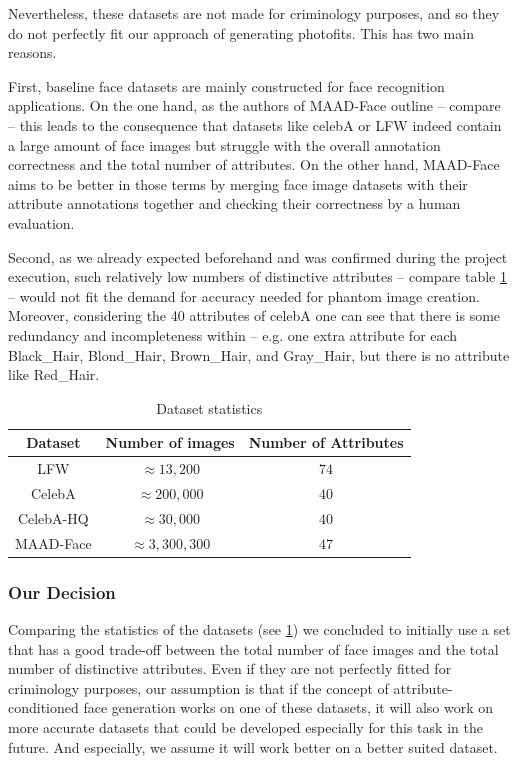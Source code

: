 \documentclass[12pt, a4paper]{article}
\begin{document}
Nevertheless, these datasets are not made for criminology purposes, and so they do not perfectly fit our approach of
generating photofits. This has two main reasons.

First, baseline face datasets are mainly constructed for face recognition applications. On the one hand, as the authors
of MAAD-Face outline -- compare \cite{DBLP2} -- this leads to the consequence that datasets like
celebA or LFW indeed contain a large amount of face images but struggle with the overall annotation correctness and the total number of attributes.
On the other hand, MAAD-Face aims to be better in those terms by merging
face image datasets with their attribute annotations together and checking their correctness by a human evaluation.

Second, as we already expected beforehand and was confirmed during the project execution, such relatively low numbers of
distinctive attributes -- compare table \ref{tab:dataset-stats} -- would not fit the demand for accuracy needed for phantom image creation.
Moreover, considering the 40 attributes of celebA one can see that
there is some redundancy and incompleteness within -- e.g. one extra attribute for each Black\_Hair, Blond\_Hair,
Brown\_Hair, and Gray\_Hair, but there is no attribute like Red\_Hair.

\begin{table}[h]
    \centering
        \begin{tabular}{|c|c|c|}
            \hline
            Dataset & Number of images & Number of Attributes \\
            \hline
            LFW & $\approx 13,200$ & $74$ \\
            CelebA & $\approx 200,000$ & $40$ \\
            CelebA-HQ & $\approx 30,000$ & $40$ \\
            MAAD-Face & $\approx 3,300,300$ & $47$ \\
            \hline
        \end{tabular}
        \caption{Dataset statistics}
        \label{tab:dataset-stats}
    \end{table}

\subsubsection{Our Decision}
Comparing the statistics of the datasets (see \ref{tab:dataset-stats}) we concluded to initially use a set that has a good trade-off
between the total number of face images and the total number of distinctive attributes. Even if they are not perfectly
fitted for criminology purposes, our assumption is that if the concept of attribute-conditioned face generation works on
one of these datasets, it will also work on more accurate datasets that could be developed especially for this task in the future.
And especially, we assume it will work better on a better suited dataset.
\end{document}

